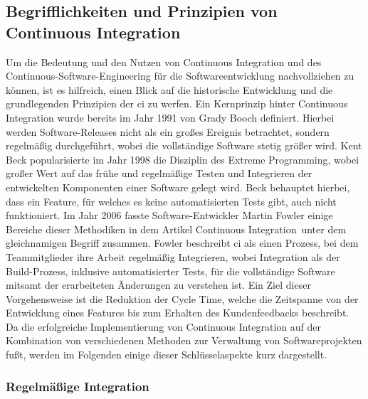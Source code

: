 \subsection{Begrifflichkeiten und Prinzipien von Continuous Integration} \label{subsec:02-background-2}

Um die Bedeutung und den Nutzen von Continuous Integration und des Continuous-Software-Engineering für die
Softwareentwicklung nachvollziehen zu können, ist es hilfreich, einen Blick auf die historische Entwicklung und die
grundlegenden Prinzipien der \acrshort{ci} zu werfen.
Ein Kernprinzip hinter Continuous Integration wurde bereits im Jahr 1991 von Grady Booch definiert.
Hierbei werden Software-Releases nicht als ein großes Ereignis betrachtet, sondern regelmäßig durchgeführt, wobei
die vollständige Software stetig größer wird.
Kent Beck popularisierte im Jahr 1998 die Disziplin des \glqq Extreme Programming\grqq, wobei großer Wert auf das frühe
und regelmäßige Testen und Integrieren der entwickelten Komponenten einer Software gelegt wird.
Beck behauptet hierbei, dass ein Feature, für welches es keine automatisierten Tests gibt, auch nicht funktioniert.
Im Jahr 2006 fasste Software-Entwickler Martin Fowler einige Bereiche dieser Methodiken in dem Artikel
\glqq Continuous Integration\grqq\ unter dem gleichnamigen Begriff zusammen.
Fowler beschreibt \acrshort{ci} als einen Prozess, bei dem Teammitglieder ihre Arbeit regelmäßig Integrieren,
wobei Integration als der Build-Prozess, inklusive automatisierter Tests, für die vollständige Software mitsamt der
erarbeiteten Änderungen zu verstehen ist.
Ein Ziel dieser Vorgehensweise ist die Reduktion der \glqq Cycle Time\grqq, welche die Zeitspanne von der Entwicklung
eines Features bis zum Erhalten des Kundenfeedbacks beschreibt.
Da die erfolgreiche Implementierung von Continuous Integration auf der Kombination von verschiedenen Methoden zur
Verwaltung von Softwareprojekten fußt, werden im Folgenden einige dieser Schlüsselaspekte kurz dargestellt.

\subsubsection{Regelmäßige Integration}

